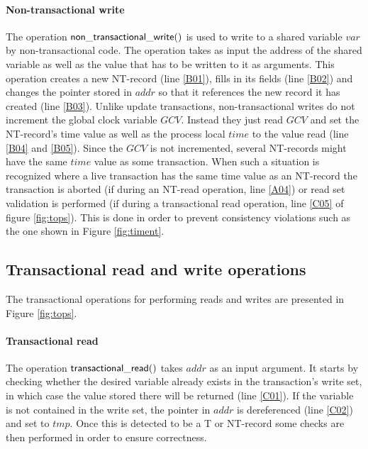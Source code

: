 \documentclass[11pt,letterpaper]{article}
\begin{document}
\paragraph{Non-transactional write}
The operation ${\sf non\_transactional\_write()}$ is used to write to 
a shared variable $\mathit{var}$ 
by non-transactional code.
The operation takes as input the address of the shared variable as well as the 
value that has to be written to it as arguments.
This operation  
creates a  new  NT-record  (line  \ref{B01}),  fills  in  its  fields  (line
\ref{B02})  and 
changes the pointer stored in $\mathit{addr}$ so that it references the 
new record it has created  (line \ref{B03}).
Unlike update transactions, non-transactional writes do not increment
the global clock variable $\mathit{GCV}$.
Instead they just read $\mathit{GCV}$ and set the NT-record's time value as well as
the process local $\mathit{time}$ to the value read (line \ref{B04} and \ref{B05}).
Since the $\mathit{GCV}$ is not incremented, several NT-records might have the same
$\mathit{time}$ value as some transaction.
When such a situation is recognized where a live transaction has the same time value
as an NT-record the transaction is aborted (if during an NT-read operation,
line \ref{A04}) or read set validation is performed (if during a transactional
read operation, line \ref{C05} of figure \ref{fig:tops}).
This is done in order to prevent consistency violations such as the one shown 
in Figure \ref{fig:timent}.


\subsection{Transactional read and write operations}

The transactional operations for performing reads and writes are 
presented in Figure \ref{fig:tops}. 

\paragraph{Transactional read}

The operation ${\sf  transactional\_read()}$ takes $\mathit{addr}$ as an
input argument. It starts by checking  
whether the  desired variable already  exists in the  transaction{}'s write
set, in which  
case  the   value  stored there  will   be  returned  (line
\ref{C01}). If the variable is not contained  
in  the write  set, the  pointer in  $\mathit{addr}$ is  dereferenced (line
\ref{C02}) and set to $\mathit{tmp}$. Once this is detected to be a T or NT-record
some checks are then performed in order to ensure correctness.
\end{document}
